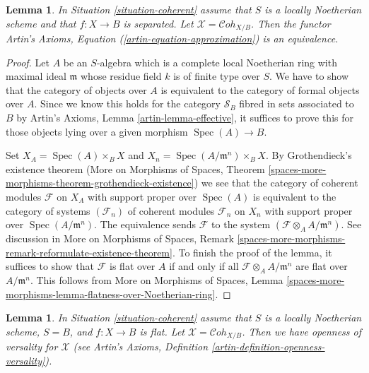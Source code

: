 \documentclass{stacks-project}
\theoremstyle{plain}
\newtheorem{lemma}[subsection]{Lemma}
\theoremstyle{definition}
\theoremstyle{remark}
\numberwithin{equation}{subsection}
\def\Spec{\mathop{\mathrm{Spec}}}
\def\Cohstack{\mathcal{C}\!\mathit{oh}}
\begin{document}
\begin{lemma}
\label{lemma-coherent-existence}
In Situation \ref{situation-coherent} assume that $S$ is a locally Noetherian
scheme and that $f : X \to B$ is separated.
Let $\mathcal{X} = \Cohstack_{X/B}$. Then the functor
Artin's Axioms, Equation (\ref{artin-equation-approximation})
is an equivalence.
\end{lemma}

\begin{proof}
Let $A$ be an $S$-algebra which is a complete local Noetherian ring
with maximal ideal $\mathfrak m$
whose residue field $k$ is of finite type over $S$.
We have to show that the category of objects over $A$ is
equivalent to the category of formal objects over $A$.
Since we know this holds for the category $\mathcal{S}_B$
fibred in sets associated to $B$ by Artin's Axioms, 
Lemma \ref{artin-lemma-effective}, it suffices to prove this
for those objects lying over a given morphism $\Spec(A) \to B$.

\medskip\noindent
Set $X_A = \Spec(A) \times_B X$ and $X_n = \Spec(A/\mathfrak m^n) \times_B X$.
By Grothendieck's existence theorem
(More on Morphisms of Spaces, Theorem
\ref{spaces-more-morphisms-theorem-grothendieck-existence})
we see that the category of coherent modules $\mathcal{F}$
on $X_A$ with support proper over $\Spec(A)$ is equivalent
to the category of systems $(\mathcal{F}_n)$ of coherent modules
$\mathcal{F}_n$ on $X_n$ with support proper over
$\Spec(A/\mathfrak m^n)$. The equivalence sends $\mathcal{F}$
to the system $(\mathcal{F} \otimes_A A/\mathfrak m^n)$. See discussion in
More on Morphisms of Spaces, Remark
\ref{spaces-more-morphisms-remark-reformulate-existence-theorem}.
To finish the proof of the lemma, it suffices to show that
$\mathcal{F}$ is flat over $A$ if and only if all
$\mathcal{F} \otimes_A A/\mathfrak m^n$ are flat over $A/\mathfrak m^n$.
This follows from
More on Morphisms of Spaces, Lemma
\ref{spaces-more-morphisms-lemma-flatness-over-Noetherian-ring}.
\end{proof}

\begin{lemma}
\label{lemma-coherent-defo-thy}
In Situation \ref{situation-coherent} assume that
$S$ is a locally Noetherian scheme, $S = B$, and $f : X \to B$ is flat.
Let $\mathcal{X} = \Cohstack_{X/B}$. Then we have openness of
versality for $\mathcal{X}$ (see
Artin's Axioms, Definition \ref{artin-definition-openness-versality}).
\end{lemma}
\end{document}
